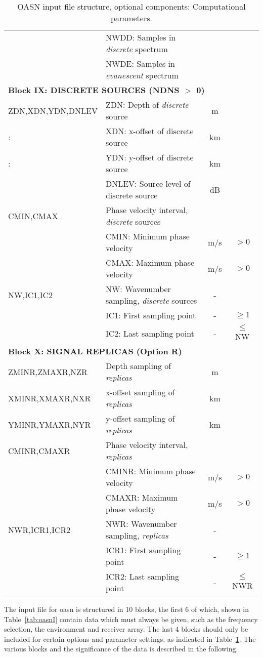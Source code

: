 \begin{table}
\begin{center}
\begin{tabular}{|l|l|c|c|}
	& NWDD: Samples in {\em discrete} spectrum &  &  \\
	& NWDE: Samples in {\em evanescent} spectrum &  &  \\
\hline
\multicolumn{4}{|l|}{\bf Block IX: DISCRETE SOURCES (NDNS $>$ 0)}  \\ 
\hline
ZDN,XDN,YDN,DNLEV & ZDN: Depth of {\em discrete} source & m & \\
:	& XDN: x-offset of discrete source & km & \\ 
:	& YDN: y-offset of discrete source & km & \\
	& DNLEV: Source level of discrete source & dB & \\
CMIN,CMAX & Phase velocity interval, {\em discrete} sources & & \\ 
	& CMIN: Minimum phase velocity & m/s & $>0$ \\
	& CMAX: Maximum phase velocity & m/s & $>0$ \\
NW,IC1,IC2 & NW: Wavenumber sampling, {\em discrete} sources & - &   \\
	& IC1: First sampling point & - & $\geq 1$ \\
	& IC2: Last sampling point & - & $\leq$NW \\
\hline
\multicolumn{4}{|l|}{\bf Block X: SIGNAL REPLICAS (Option R)}  \\ 
\hline
ZMINR,ZMAXR,NZR & Depth sampling of {\em replicas} & m & \\ 
XMINR,XMAXR,NXR & x-offset sampling of {\em replicas} & km & \\ 
YMINR,YMAXR,NYR & y-offset sampling of {\em replicas} & km & \\ 
CMINR,CMAXR & Phase velocity interval, {\em replicas} & & \\ 
	& CMINR: Minimum phase velocity & m/s & $>0$ \\
	& CMAXR: Maximum phase velocity & m/s & $>0$ \\
NWR,ICR1,ICR2 & NWR: Wavenumber sampling, {\em replicas} & - &   \\
	& ICR1: First sampling point & - & $\geq 1$ \\
	& ICR2: Last sampling point & - & $\leq$NWR \\
\hline
\end{tabular}
\end{center}
\caption{OASN input file structure, optional components: 
Computational parameters.
 \label{tab:oasnII} }
\end{table} 

The input file for oasn is structured in 10 blocks, the first 6 of
which, shown in Table~\ref{tab:oasnI} contain data which must always
be given, such as the  frequency selection, the environment and
receiver array. The last 4 blocks
should only be included for certain options and parameter settings, as
indicated in Table~\ref{tab:oasnII}. The various blocks and the
significance of the data is described in the following.

